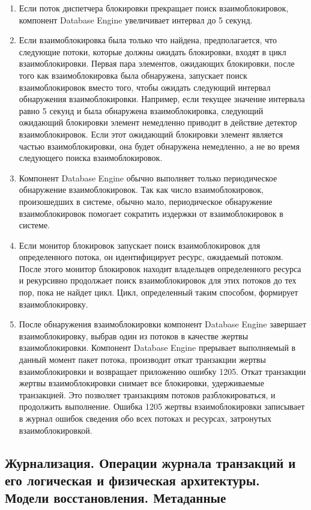\begin{enumerate}
	\item Если поток диспетчера блокировки прекращает поиск взаимоблокировок, компонент Database Engine увеличивает интервал до 5 секунд.
	\item Если взаимоблокировка была только что найдена, предполагается, что следующие потоки, которые должны ожидать блокировки, входят в цикл взаимоблокировки. Первая пара элементов, ожидающих блокировки, после того как взаимоблокировка была обнаружена, запускает поиск
	взаимоблокировок вместо того, чтобы ожидать следующий интервал обнаружения взаимоблокировки. Например, если текущее значение интервала равно 5 секунд и была обнаружена взаимоблокировка, следующий ожидающий блокировки элемент немедленно приводит в действие детектор взаимоблокировок. Если этот ожидающий блокировки элемент является частью взаимоблокировки, она будет обнаружена немедленно, а не во время следующего поиска взаимоблокировок.
	\item Компонент Database Engine обычно выполняет только периодическое обнаружение взаимоблокировок. Так как число взаимоблокировок, произошедших в системе, обычно мало, периодическое обнаружение взаимоблокировок помогает сократить издержки от взаимоблокировок в системе.
	\item Если монитор блокировок запускает поиск взаимоблокировок для определенного потока, он идентифицирует ресурс, ожидаемый потоком. После этого монитор блокировок находит владельцев определенного ресурса и рекурсивно продолжает поиск взаимоблокировок для этих потоков до тех пор, пока не найдет цикл. Цикл, определенный таким способом, формирует взаимоблокировку. 
	\item После обнаружения взаимоблокировки компонент Database Engine завершает взаимоблокировку, выбрав один из потоков в качестве жертвы взаимоблокировки. Компонент Database Engine прерывает выполняемый в данный момент пакет потока, производит откат транзакции жертвы
	взаимоблокировки и возвращает приложению ошибку 1205. Откат транзакции жертвы взаимоблокировки снимает все блокировки, удерживаемые транзакцией. Это позволяет транзакциям потоков разблокироваться, и продолжить выполнение. Ошибка 1205 жертвы взаимоблокировки
	записывает в журнал ошибок сведения обо всех потоках и ресурсах, затронутых взаимоблокировкой.
\end{enumerate}

\subsection{Журнализация. Операции журнала транзакций и его логическая и физическая архитектуры. Модели восстановления. Метаданные}

